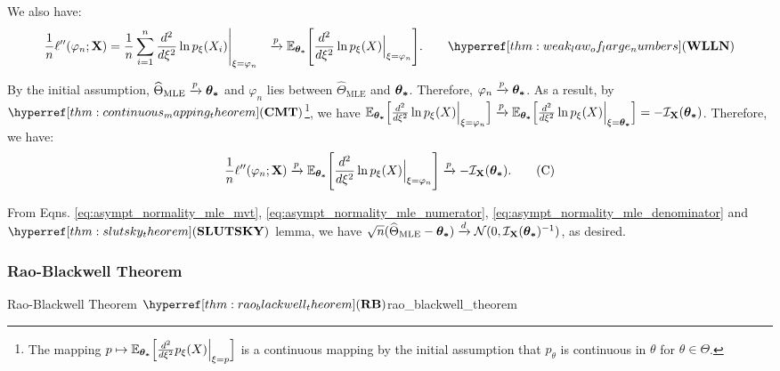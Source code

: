 \begin{proof*}
    \noindent We also have:
    \begin{align*}
        \frac{1}{n}\ell''(\varphi_n;\bX) &= \frac{1}{n} \sum_{i=1}^n \frac{d^2}{d\xi^2}\ln p_\xi(X_i)\Bigg|_{\xi=\varphi_n} 
        &\xrightarrow{p} \E_{\btheta}\biggSquare{\frac{d^2}{d\xi^2}\ln p_\xi(X)\Big|_{\xi=\varphi_n}}. \qquad \WLLN
    \end{align*} 

    \noindent By the initial assumption, $\widehat{\Theta}_\mathrm{MLE}\xrightarrow{p}\boldsymbol{\theta_*}$ and $\varphi_n$ lies between $\widehat{\Theta}_\mathrm{MLE}$ and $\boldsymbol{\theta_*}$. Therefore, $\varphi_n\xrightarrow{p}\boldsymbol{\theta_*}$. As a result, by $\CMT$\footnote{The mapping $p\mapsto \mathbb{E}_{\boldsymbol{\theta_*}}\Big[ \frac{d^2}{d\xi^2} p_\xi(X)\Big|_{\xi=p} \Big]$ is a continuous mapping by the initial assumption that $p_\theta$ is continuous in $\theta$ for $\theta\in\Theta$.}, we have $\mathbb{E}_{\boldsymbol{\theta_*}}\Big[ \frac{d^2}{d\xi^2}\ln p_\xi(X)\Big|_{\xi=\varphi_n} \Big]\xrightarrow{p}\mathbb{E}_{\boldsymbol{\theta_*}}\Big[ \frac{d^2}{d\xi^2}\ln p_\xi(X)\Big|_{\xi=\boldsymbol{\theta_*}} \Big] = -\mathcal{I}_{{\bf X}}(\boldsymbol{\theta_*})$. Therefore, we have:
    \begin{equation}
        \label{eq:asympt_normality_mle_denominator} 
        \frac{1}{n}\ell''(\varphi_n;{\bf X}) \xrightarrow{p} \mathbb{E}_{\boldsymbol{\theta_*}}\Bigg[ \frac{d^2}{d\xi^2}\ln p_\xi(X)\Big|_{\xi=\varphi_n} \Bigg] \xrightarrow{p} -\mathcal{I}_{{\bf X}}(\boldsymbol{\theta_*}).\tag{C}
    \end{equation} 

    \noindent From Eqns. \ref{eq:asympt_normality_mle_mvt}, \ref{eq:asympt_normality_mle_numerator}, \ref{eq:asympt_normality_mle_denominator} and $\SLUTSKY$ lemma, we have $\sqrt{n}(\widehat{\Theta}_\mathrm{MLE} - \boldsymbol{\theta_*}) \xrightarrow{d}\mathcal{N}(0, \mathcal{I}_{{\bf X}}(\boldsymbol{\theta_*})^{-1})$, as desired.
\end{proof*}

\subsubsection{Rao-Blackwell Theorem}
\begin{theorem}{Rao-Blackwell Theorem $\RB$}{rao_blackwell_theorem}
     
\end{theorem}


